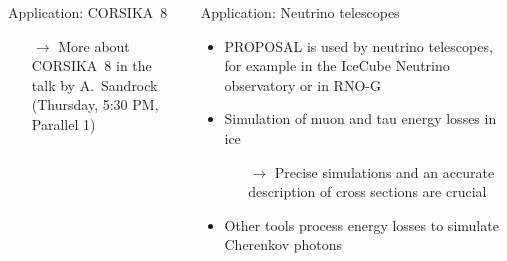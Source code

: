 \documentclass[t]{beamer}
\newlength{\thirdtextwidth}
\newlength{\itemseparation}
\begin{document}
\begin{columns}[onlytextwidth]
\begin{column}{\thirdtextwidth}
\begin{block}[equal height group=B]{Application: CORSIKA~8}
              \begin{center}
                \colorbox{light-gray}{
                  \begin{minipage}{0.80\linewidth}
                    \begin{itemize}
                      \item[\textcolor{tugreen}{$\rightarrow$}] More about CORSIKA~8 in the talk by A.~Sandrock \\(Thursday, 5:30 PM, Parallel 1)
                    \end{itemize}
                  \end{minipage}
                }
              \end{center}


      \end{block}%
    \end{column}%
    \begin{column}{\thirdtextwidth}%
      \begin{block}[equal height group=B]{Application: Neutrino telescopes}%
        \begin{itemize}
          \setlength\itemsep{\itemseparation}
          \item PROPOSAL is used by neutrino telescopes, for example in the IceCube Neutrino observatory or in RNO-G
          \item Simulation of muon and tau energy losses in ice
          \begin{itemize}
            \setlength\itemsep{\itemseparation}
            \item[$\rightarrow$] Precise simulations and an accurate description of cross sections are crucial
          \end{itemize}
          \item Other tools process energy losses to simulate Cherenkov photons
        \end{itemize}

        \vspace{2em}


\end{block}
\end{column}
\end{columns}
\end{document}
